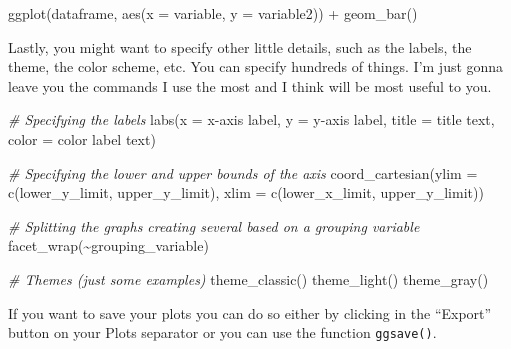\documentclass[
]{book}
\newenvironment{Shaded}{\begin{snugshade}}{\end{snugshade}}
\newcommand{\AttributeTok}[1]{\textcolor[rgb]{0.77,0.63,0.00}{#1}}
\newcommand{\CommentTok}[1]{\textcolor[rgb]{0.56,0.35,0.01}{\textit{#1}}}
\newcommand{\FunctionTok}[1]{\textcolor[rgb]{0.00,0.00,0.00}{#1}}
\newcommand{\NormalTok}[1]{#1}
\newcommand{\SpecialCharTok}[1]{\textcolor[rgb]{0.00,0.00,0.00}{#1}}
\newcommand{\StringTok}[1]{\textcolor[rgb]{0.31,0.60,0.02}{#1}}
\begin{document}
\begin{Shaded}
\begin{Highlighting}[]
\FunctionTok{ggplot}\NormalTok{(dataframe, }\FunctionTok{aes}\NormalTok{(}\AttributeTok{x =}\NormalTok{ variable, }\AttributeTok{y =}\NormalTok{ variable2)) }\SpecialCharTok{+}
  \FunctionTok{geom\_bar}\NormalTok{() }
\end{Highlighting}
\end{Shaded}

Lastly, you might want to specify other little details, such as the labels, the theme, the color scheme, etc.
You can specify hundreds of things.
I'm just gonna leave you the commands I use the most and I think will be most useful to you.

\begin{Shaded}
\begin{Highlighting}[]
\CommentTok{\# Specifying the labels}
\FunctionTok{labs}\NormalTok{(}\AttributeTok{x =} \StringTok{\textquotesingle{}x{-}axis label\textquotesingle{}}\NormalTok{, }\AttributeTok{y =} \StringTok{\textquotesingle{}y{-}axis label\textquotesingle{}}\NormalTok{, }\AttributeTok{title =} \StringTok{\textquotesingle{}title text\textquotesingle{}}\NormalTok{, }\AttributeTok{color =} \StringTok{\textquotesingle{}color label text\textquotesingle{}}\NormalTok{)}

\CommentTok{\# Specifying the lower and upper bounds of the axis}
\FunctionTok{coord\_cartesian}\NormalTok{(}\AttributeTok{ylim =} \FunctionTok{c}\NormalTok{(}\StringTok{\textquotesingle{}lower\_y\_limit\textquotesingle{}}\NormalTok{, }\StringTok{\textquotesingle{}upper\_y\_limit\textquotesingle{}}\NormalTok{),}
                \AttributeTok{xlim =} \FunctionTok{c}\NormalTok{(}\StringTok{\textquotesingle{}lower\_x\_limit\textquotesingle{}}\NormalTok{, }\StringTok{\textquotesingle{}upper\_y\_limit\textquotesingle{}}\NormalTok{))}

\CommentTok{\# Splitting the graphs creating several based on a grouping variable}
\FunctionTok{facet\_wrap}\NormalTok{(}\SpecialCharTok{\textasciitilde{}}\StringTok{\textquotesingle{}grouping\_variable\textquotesingle{}}\NormalTok{)}

\CommentTok{\# Themes (just some examples)}
\FunctionTok{theme\_classic}\NormalTok{()}
\FunctionTok{theme\_light}\NormalTok{()}
\FunctionTok{theme\_gray}\NormalTok{()}
\end{Highlighting}
\end{Shaded}

If you want to save your plots you can do so either by clicking in the ``Export'' button on your Plots separator or you can use the function \texttt{ggsave()}.
\end{document}
